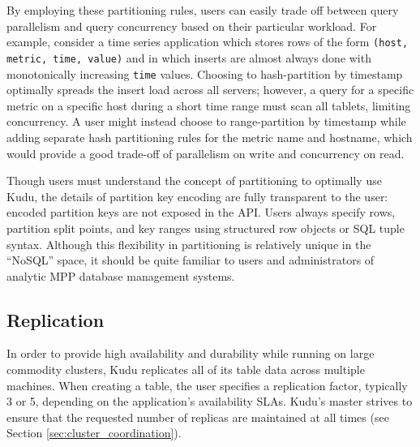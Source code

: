 \documentclass{vldb}
\begin{document}
By employing these partitioning rules, users can easily trade off between query parallelism and
query concurrency based on their particular workload. For example, consider a time series
application which stores rows of the form {\tt (host, metric, time, value)} and in which inserts
are almost always done with monotonically increasing {\tt time} values. Choosing to
hash-partition by timestamp optimally spreads the insert load across all servers; however, a query
for a specific metric on a specific host during a short time range must scan all tablets, limiting
concurrency. A user might instead choose to range-partition by timestamp while adding separate
hash partitioning rules for the metric name and hostname, which would provide a good trade-off
of parallelism on write and concurrency on read.

Though users must understand the concept of partitioning to optimally use Kudu, the details
of partition key encoding are fully transparent to the user: encoded partition keys are not exposed
in the API. Users always specify rows, partition split points, and key ranges using structured
row objects or SQL tuple syntax. Although this flexibility in partitioning is relatively unique
in the ``NoSQL'' space, it should be quite familiar to users and administrators of
analytic MPP database management systems.

\subsection{Replication}
\label{sec:replication}

In order to provide high availability and durability while running on large commodity clusters,
Kudu replicates all of its table data across multiple machines. When creating a table,
the user specifies a replication factor, typically 3 or 5, depending on the application's
availability SLAs. Kudu's master strives to ensure that the requested number of replicas are maintained
at all times (see Section \ref{sec:cluster_coordination}).
\end{document}
